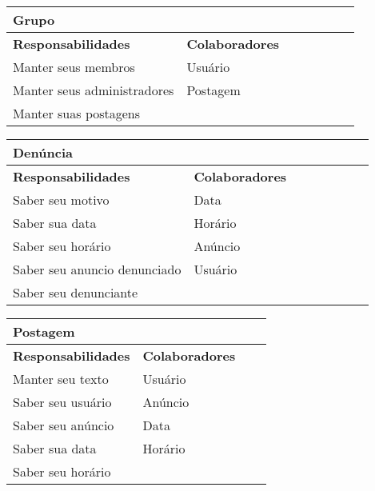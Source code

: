 \documentclass{article}
\begin{document}
\textcolor{red}{
    \begin{center}
   	 \begin{tabular}{|p{0.5\linewidth}|p{0.5\linewidth}|}
\hline
 	\multicolumn{2}{|p{\textwidth}|}{
{\large \textbf{Grupo}}
}  \\
\hline
\textbf{Responsabilidades} & \textbf{Colaboradores} \\ 
\hline
  	Manter seus membros & Usuário \\
  	\hline
  	Manter seus administradores & Postagem \\
  	\hline
  	Manter suas postagens & \\
  	\hline
   	\end{tabular} 
    \end{center}
}
\textcolor{red}{
    \begin{center}
   	 \begin{tabular}{|p{0.5\linewidth}|p{0.5\linewidth}|}
\hline
 	\multicolumn{2}{|p{\textwidth}|}{
{\large \textbf{Denúncia}}
}  \\
\hline
\textbf{Responsabilidades} & \textbf{Colaboradores} \\ 
\hline
  	Saber seu motivo &  Data \\
  	\hline
  	Saber sua data &  Horário \\
  	\hline
  	Saber seu horário &  Anúncio \\
  	\hline
  	Saber seu anuncio denunciado & Usuário \\
  	\hline
  	Saber seu denunciante &  \\
  	\hline
   	\end{tabular} 
    \end{center}
}
\textcolor{red}{
\begin{center}
 \begin{tabular}{|p{0.5\linewidth}|p{0.5\linewidth}|}
  \hline
  \multicolumn{2}{|p{\textwidth}|}{
   {\large \textbf{Postagem}}} \\
  \hline
  \textbf{Responsabilidades} & \textbf{Colaboradores} \\ 
  \hline
  Manter seu texto &  Usuário \\
  \hline
  Saber seu usuário & Anúncio \\
  \hline
  Saber seu anúncio & Data \\
  \hline
  Saber sua data & Horário \\
  \hline
  Saber seu horário &  \\
  \hline 
 \end{tabular} 
\end{center}
}
\end{document}
